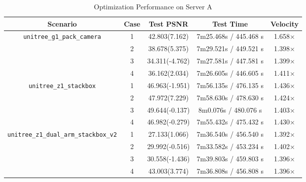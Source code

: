 \begin{table}[htbp]
    \centering
    \small %
    \renewcommand{\arraystretch}{1.2} %
    \setlength{\arrayrulewidth}{0.8pt} %
    \caption{Optimization Performance on Server A}
    \label{tab:server_a_optimization}
    
    \begin{tabular}{|c|c|c|c|c|}
        \hline
        \rowcolor{yellow} \textbf{Scenario} & \textbf{Case} & \textbf{Test PSNR} & \textbf{Test Time} & \textbf{Velocity} \\ \hline
        
        \multirow{4}{*}{\texttt{unitree\_g1\_pack\_camera}} 
        & 1 & 42.803(7.162)  & 7m25.468s / 445.468 s & 1.658$\times$ \\ \cline{2-5} %
        & 2 & 38.678(5.375)  & 7m29.521s / 449.521 s & 1.398$\times$ \\ \cline{2-5}
        & 3 & 34.311(-4.762) & 7m27.581s / 447.581 s & 1.399$\times$ \\ \cline{2-5}
        & 4 & 36.162(2.034)  & 7m26.605s / 446.605 s & 1.411$\times$ \\ \hline      %
        
        \multirow{4}{*}{\texttt{unitree\_z1\_stackbox}} 
        & 1 & 46.963(-1.951) & 7m56.135s / 476.135 s & 1.436$\times$ \\ \cline{2-5}
        & 2 & 47.972(7.229)  & 7m58.630s / 478.630 s & 1.424$\times$ \\ \cline{2-5}
        & 3 & 49.644(-0.137) & 8m0.076s / 480.076 s & 1.403$\times$ \\ \cline{2-5}
        & 4 & 46.982(-0.279) & 7m55.432s / 475.432 s & 1.430$\times$ \\ \hline
        
        \multirow{4}{*}{\texttt{unitree\_z1\_dual\_arm\_stackbox\_v2}} 
        & 1 & 27.133(1.066)  & 7m36.540s / 456.540 s & 1.392$\times$ \\ \cline{2-5}
        & 2 & 29.992(-0.516) & 7m33.582s / 453.234 s & 1.402$\times$ \\ \cline{2-5}
        & 3 & 30.558(-1.436) & 7m39.803s / 459.803 s & 1.396$\times$ \\ \cline{2-5}
        & 4 & 43.003(3.774)  & 7m36.808s / 456.808 s & 1.396$\times$ \\ \hline
        

\end{tabular}
\end{table}

